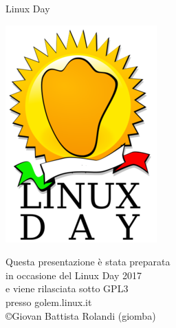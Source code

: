 \documentclass{beamer}
\begin{document}
\begin{frame}
    \begin{block}{Linux Day}
    \centering
    \begin{minipage}{.15\linewidth}
      \includegraphics[width=1\linewidth]{img/linuxday-logo.png}
    \end{minipage}
    \begin{minipage}{.65\linewidth}
    \centering
    Questa presentazione è stata preparata\\ %
    in occasione del Linux Day 2017\\
    e viene rilasciata sotto GPL3\\
    presso golem.linux.it\\
    \copyright Giovan Battista Rolandi (giomba)\\

\end{minipage}
\end{block}
\end{frame}
\end{document}
